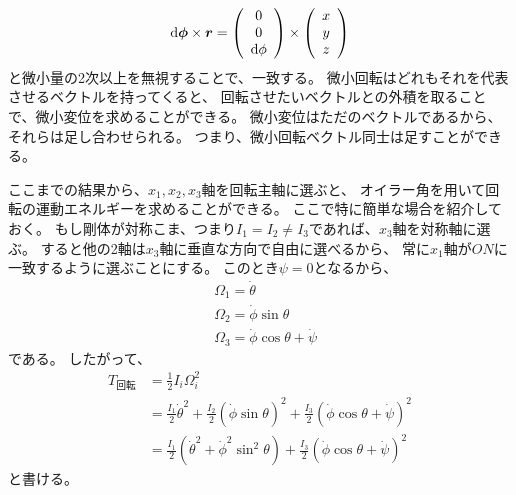 \documentclass[a4paper]{jsarticle}
\def\vec#1{\mbox{\boldmath $#1$}}
\newcommand{\ddif}{{\rm d}}
\begin{document}
\begin{screen}
	\begin{align}
		\ddif \vec{\phi} \times \vec{r} = \left(
			\begin{array}{c}
				0 \\ 0 \\ \ddif \phi
			\end{array}
		\right) \times \left(
			\begin{array}{c}
				x \\ y \\ z
			\end{array}
		\right)
	\end{align}
	と微小量の2次以上を無視することで、一致する。
	微小回転はどれもそれを代表させるベクトルを持ってくると、
	回転させたいベクトルとの外積を取ることで、微小変位を求めることができる。
	微小変位はただのベクトルであるから、それらは足し合わせられる。
	つまり、微小回転ベクトル同士は足すことができる。
\end{screen}

ここまでの結果から、$x_1, x_2, x_3$軸を回転主軸に選ぶと、
オイラー角を用いて回転の運動エネルギーを求めることができる。
ここで特に簡単な場合を紹介しておく。
もし剛体が対称こま、つまり$I_1 = I_2 \ne I_3$であれば、$x_3$軸を対称軸に選ぶ。
すると他の2軸は$x_3$軸に垂直な方向で自由に選べるから、
常に$x_1$軸が$ON$に一致するように選ぶことにする。
このとき$\psi = 0$となるから、
\begin{align}
	&\Omega_1 = \dot{\theta} \\
	&\Omega_2 = \dot{\phi} \sin \theta \\
	&\Omega_3 = \dot{\phi} \cos \theta + \dot{\psi}
\end{align}
である。
したがって、
\begin{align}
	T_{\mbox{回転}} &= \frac{1}{2} I_i \Omega_i^2 \\
	&= \frac{I_1}{2} \dot{\theta}^2
	+ \frac{I_2}{2} \left(\dot{\phi} \sin \theta \right)^2
	+ \frac{I_3}{2} \left(\dot{\phi} \cos \theta + \dot{\psi} \right)^2 \\
	&= \frac{I_1}{2} \left(\dot{\theta}^2 + \dot{\phi}^2 \sin^2 \theta \right)
	+ \frac{I_3}{2} \left(\dot{\phi} \cos \theta + \dot{\psi} \right)^2
\end{align}
と書ける。
\end{document}

